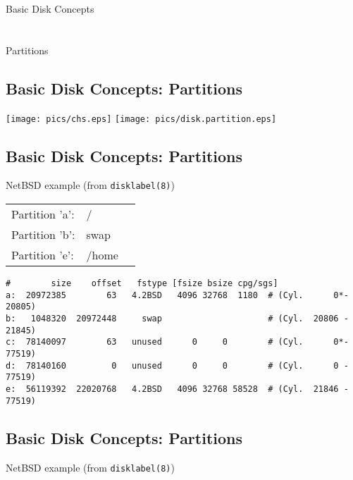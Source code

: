 \documentclass[xga]{xdvislides}
\begin{document}
\newpage
\vspace*{\fill}
\begin{center}
	\Hugesize
		Basic Disk Concepts\\ [1em]
	\hspace*{5mm}
	\blueline\\
	\hspace*{5mm}\\
		Partitions
\end{center}
\vspace*{\fill}

\subsection{Basic Disk Concepts: Partitions}
	\begin{center}
		\texttt{[image: pics/chs.eps]}
		\texttt{[image: pics/disk.partition.eps]} \\
	\end{center}



\subsection{Basic Disk Concepts: Partitions}
NetBSD example (from {\tt disklabel(8)})

\begin{tabular}{ l l c }
Partition 'a': & / & \\
Partition 'b': & swap & \\
Partition 'e': & /home & \\
\end{tabular}

\begin{verbatim}
#        size    offset   fstype [fsize bsize cpg/sgs]
a:  20972385        63   4.2BSD   4096 32768  1180  # (Cyl.      0*- 20805)
b:   1048320  20972448     swap                     # (Cyl.  20806 - 21845)
c:  78140097        63   unused      0     0        # (Cyl.      0*- 77519)
d:  78140160         0   unused      0     0        # (Cyl.      0 - 77519)
e:  56119392  22020768   4.2BSD   4096 32768 58528  # (Cyl.  21846 - 77519)
\end{verbatim}

\subsection{Basic Disk Concepts: Partitions}
NetBSD example (from {\tt disklabel(8)})
\end{document}
